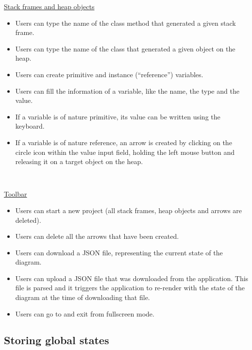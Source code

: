 \documentclass[]{usiinfbachelorproject}
\begin{document}
\ul{Stack frames and heap objects}

\begin{itemize}
	\item Users can type the name of the class method that generated a given stack frame.
	\item Users can type the name of the class that generated a given object on the heap.
	\item Users can create primitive and instance (``reference'') variables.
	\item Users can fill the information of a variable, like the name, the type and the value.
	\item If a variable is of nature primitive, its value can be written using the keyboard.
	\item If a variable is of nature reference, an arrow is created by clicking on the circle icon within the value input field, holding the left mouse button and releasing it on a target object on the heap.
\end{itemize}\

\vspace{\fill}
\pagebreak

\ul{Toolbar}

\begin{itemize}
	\item Users can start a new project (all stack frames, heap objects and arrows are deleted).
	\item Users can delete all the arrows that have been created.
	\item Users can download a JSON file, representing the current state of the diagram.
	\item Users can upload a JSON file that was downloaded from the application. This file is parsed and it triggers the application to re-render with the state of the diagram at the time of downloading that file.
	\item Users can go to and exit from fullscreen mode.
\end{itemize}

\subsection{Storing global states} \label{storing states}
\end{document}
